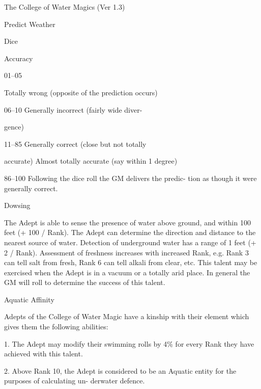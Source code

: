 \begin{Chapter}{The College of Water Magics (Ver 1.3)}
\begin{talent}[T-1]{Predict Weather }
\begin{effects}
Dice 

Accuracy 

01–05 

Totally wrong (opposite of the prediction 
occurs) 

06–10  Generally incorrect (fairly wide diver-

gence) 

11–85  Generally correct (close but not totally 

accurate) 
Almost totally accurate (say within 1 
degree) 

86–100 
Following the dice roll the GM delivers the predic-
tion as though it were generally correct. 



\end{effects}
\end{talent}

\begin{talent}[T-2]{Dowsing }

\begin{effects}
The Adept is able to sense the presence of 
water  above  ground,  and  within  100  feet  (+  100  / 
Rank).  The  Adept  can determine  the direction and 
distance  to  the  nearest  source  of  water.  Detection 
of  underground  water  has  a  range  of  1  feet  (+  2  / 
Rank).  Assessment  of  freshness  increases  with 
increased  Rank,  e.g.  Rank  3  can  tell  salt  from 
fresh,  Rank  6  can  tell  alkali  from  clear,  etc.  This 
talent  may  be  exercised  when  the  Adept  is  in  a 
vacuum or  a  totally  arid  place.  In  general  the  GM 
will roll to determine the success of this talent. 

\end{effects}
\end{talent}

\begin{talent}[T-3]{Aquatic Affinity }

\begin{effects}
 Adepts  of  the  College  of  Water  Magic 
have a kinship with their element which gives them 
the following abilities: 

1. The Adept may modify their swimming rolls by 
4\%  for  every  Rank  they  have  achieved  with  this 
talent. 

2. Above Rank 10, the Adept is considered to be an 
Aquatic  entity  for  the  purposes  of  calculating  un-
derwater defence. 


\end{effects}
\end{talent}
\end{Chapter}
